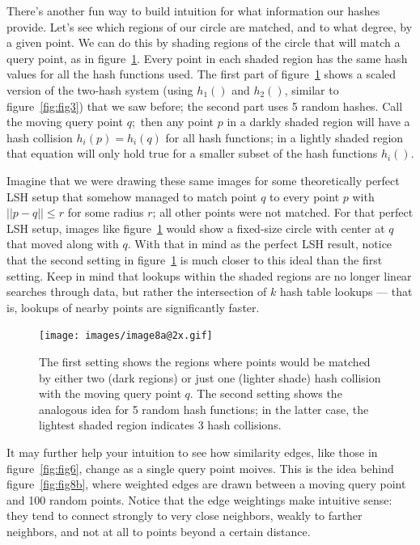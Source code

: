 \documentclass[20pt,]{extarticle}
\begin{document}
There's another fun way to build intuition for what information our
hashes provide. Let's see which regions of our circle are matched, and
to what degree, by a given point. We can do this by shading regions of
the circle that will match a query point, as in figure~\ref{fig:fig8a}.
Every point in each shaded region has the same hash values for all the
hash functions used. The first part of figure~\ref{fig:fig8a} shows a
scaled version of the two-hash system (using \(h_1()\) and \(h_2()\),
similar to figure~\ref{fig:fig3}) that we saw before; the second part
uses 5 random hashes. Call the moving query point \(q;\) then any point
\(p\) in a darkly shaded region will have a hash collision
\(h_i(p) = h_i(q)\) for all hash functions; in a lightly shaded region
that equation will only hold true for a smaller subset of the hash
functions \(h_i().\)

Imagine that we were drawing these same images for some theoretically
perfect LSH setup that somehow managed to match point \(q\) to every
point \(p\) with \(||p-q||\le r\) for some radius \(r\); all other
points were not matched. For that perfect LSH setup, images like
figure~\ref{fig:fig8a} would show a fixed-size circle with center at
\(q\) that moved along with \(q\). With that in mind as the perfect LSH
result, notice that the second setting in figure~\ref{fig:fig8a} is much
closer to this ideal than the first setting. Keep in mind that lookups
within the shaded regions are no longer linear searches through data,
but rather the intersection of \(k\) hash table lookups --- that is,
lookups of nearby points are significantly faster.

\begin{figure}
\centering
\texttt{[image: images/image8a@2x.gif]}
\caption{The first setting shows the regions where points would be
matched by either two (dark regions) or just one (lighter shade) hash
collision with the moving query point \(q\). The second setting shows
the analogous idea for 5 random hash functions; in the latter case, the
lightest shaded region indicates 3 hash collisions.}\label{fig:fig8a}
\end{figure}

It may further help your intuition to see how similarity edges, like
those in figure~\ref{fig:fig6}, change as a single query point moives.
This is the idea behind figure~\ref{fig:fig8b}, where weighted edges are
drawn between a moving query point and 100 random points. Notice that
the edge weightings make intuitive sense: they tend to connect strongly
to very close neighbors, weakly to farther neighbors, and not at all to
points beyond a certain distance.
\end{document}
